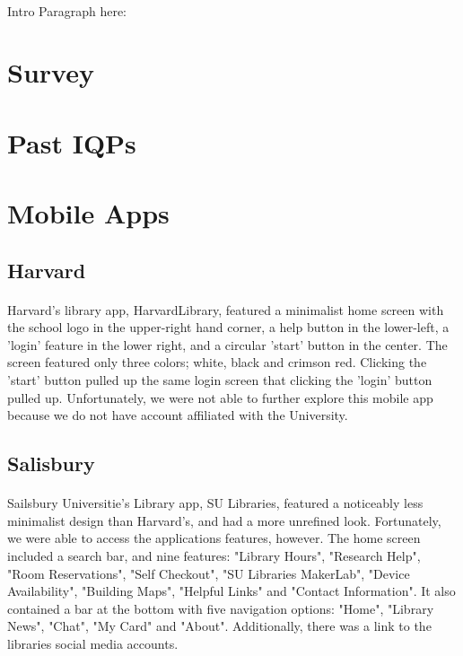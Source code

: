 \paragraph{}
Intro Paragraph here: 
\paragraph{}
\section{Survey}
\section{Past IQPs}
\section{Mobile Apps}
\subsection{Harvard}
\paragraph{}
Harvard's library app, HarvardLibrary, featured a minimalist home screen with the school logo in the upper-right hand corner, a help button in the lower-left, a 'login' feature in the lower right, and a circular 'start' button in the center. The screen featured only three colors; white, black and crimson red. Clicking the 'start' button pulled up the same login screen that clicking the 'login' button pulled up.  Unfortunately, we were not able to further explore this mobile app because we do not have account affiliated with the University. 
\subsection{Salisbury}
\paragraph{}
Sailsbury Universitie's Library app, SU Libraries, featured a noticeably less minimalist design than Harvard's, and had a more unrefined look.  Fortunately, we were able to access the applications features, however. The home screen included a search bar, and nine features: "Library Hours", "Research Help", "Room Reservations", "Self Checkout", "SU Libraries MakerLab", "Device Availability", "Building Maps", "Helpful Links" and "Contact Information". It also contained a bar at the bottom with five navigation options: "Home", "Library News", "Chat", "My Card" and "About". Additionally, there was a link to the libraries social media accounts.
